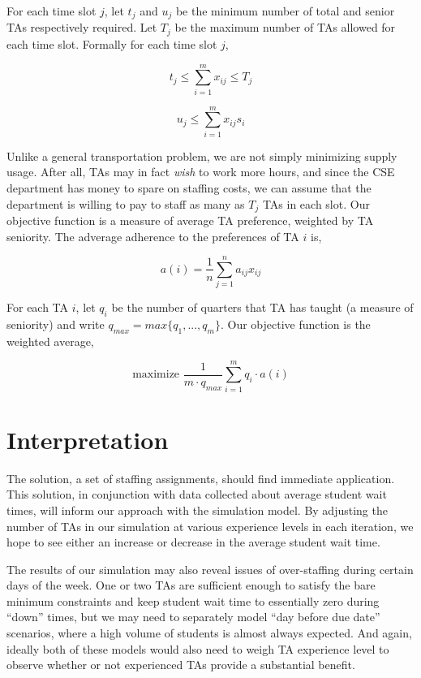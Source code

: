 \documentclass{article}
\begin{document}
\begin{multicols}{2}
For each time slot $j$, let $t_j$ and $u_j$ be the minimum number of total and senior TAs respectively required. Let $T_j$ be the maximum number of TAs allowed for each time slot. Formally for each time slot $j$,

\begin{equation}
t_j \leq \sum_{i=1}^{m}x_{ij} \leq T_j
\end{equation}

\begin{equation}
u_j \leq \sum_{i=1}^{m}x_{ij}s_i
\end{equation}

Unlike a general transportation problem, we are not simply minimizing supply usage. After all, TAs may in fact \textit{wish} to work more hours, and since the CSE department has money to spare on staffing costs, we can assume that the department is willing to pay to staff as many as $T_j$ TAs in each slot. Our objective function is a measure of average TA preference, weighted by TA seniority. The adverage adherence to the preferences of TA $i$ is,

\begin{equation}
a(i) = \frac{1}{n}\sum_{j=1}^na_{ij}x_{ij}
\end{equation}

For each TA $i$, let $q_i$ be the number of quarters that TA has taught (a measure of seniority) and write $q_{max} = max\{q_1, ..., q_m\}$. Our objective function is the weighted average,

\begin{equation}
\textrm{maximize } \frac{1}{m\cdot q_{max}} \sum_{i=1}^mq_i\cdot a(i)
\end{equation}

\section*{Interpretation}
The solution, a set of staffing assignments, should find immediate application. This solution, in conjunction with data collected about average student wait times, will inform our approach with the simulation model. By adjusting the number of TAs in our simulation at various experience levels in each iteration, we hope to see either an increase or decrease in the average student wait time.

The results of our simulation may also reveal issues of over-staffing during certain days of the week. One or two TAs are sufficient enough to satisfy the bare minimum constraints and keep student wait time to essentially zero during “down” times, but we may need to separately model “day before due date” scenarios, where a high volume of students is almost always expected. And again, ideally both of these models would also need to weigh TA experience level to observe whether or not experienced TAs provide a substantial benefit.


\end{multicols}
\end{document}
